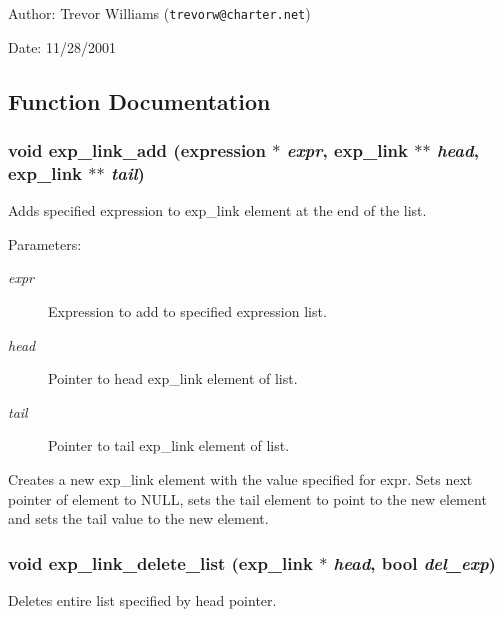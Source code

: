 \begin{Desc}
\item[Author:]Trevor Williams ({\tt trevorw@charter.net}) \end{Desc}
\begin{Desc}
\item[Date:]11/28/2001 \end{Desc}


\subsection{Function Documentation}
\subsubsection{\setlength{\rightskip}{0pt plus 5cm}void exp\_\-link\_\-add ({\bf expression} $\ast$ {\em expr}, {\bf exp\_\-link} $\ast$$\ast$ {\em head}, {\bf exp\_\-link} $\ast$$\ast$ {\em tail})}\label{link_8h_a3}


Adds specified expression to exp\_\-link element at the end of the list. 

\begin{Desc}
\item[Parameters:]
\begin{description}
\item[{\em expr}]Expression to add to specified expression list. \item[{\em head}]Pointer to head exp\_\-link element of list. \item[{\em tail}]Pointer to tail exp\_\-link element of list.\end{description}
\end{Desc}
Creates a new exp\_\-link element with the value specified for expr. Sets next pointer of element to NULL, sets the tail element to point to the new element and sets the tail value to the new element. 
\subsubsection{\setlength{\rightskip}{0pt plus 5cm}void exp\_\-link\_\-delete\_\-list ({\bf exp\_\-link} $\ast$ {\em head}, {\bf bool} {\em del\_\-exp})}\label{link_8h_a20}


Deletes entire list specified by head pointer. 


